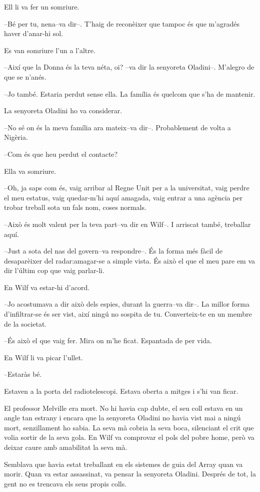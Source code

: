 Ell li va fer un somriure.

--Bé per tu, nena--va dir--. T'haig de reconèixer que tampoc és que
m'agradés haver d'anar-hi sol.

Es van somriure l'un a l'altre.

--Així que la Donna és la teva néta, oi? --va dir la senyoreta
Oladini--. M'alegro de que se n'anés.

--Jo també. Estaria perdut sense ella. La família és quelcom que s'ha de
mantenir.

La senyoreta Oladini ho va considerar.

--No sé on és la meva família ara mateix--va dir--. Probablement de
volta a Nigèria.

--Com és que heu perdut el contacte?

Ella va somriure.

--Oh, ja saps com és, vaig arribar al Regne Unit per a la universitat,
vaig perdre el meu estatus, vaig quedar-m'hi aquí amagada, vaig entrar a
una agència per trobar treball sota un fals nom, coses normals.

--Això és molt valent per la teva part--va dir en Wilf--. I arriscat
també, treballar aquí.

--Just a sota del nas del govern--va respondre--. És la forma més fàcil
de desaparèixer del radar:amagar-se a simple vista. És això el que el
meu pare em va dir l'últim cop que vaig parlar-li.

En Wilf va estar-hi d'acord.

--Jo acostumava a dir això dels espies, durant la guerra--va dir--. La
millor forma d'infiltrar-se és ser vist, així ningú no sospita de tu.
Converteix-te en un membre de la societat.

--És això el que vaig fer. Mira on m'he ficat. Espantada de per vida.

En Wilf li va picar l'ullet.

--Estaràs bé.

Estaven a la porta del radiotelescopi. Estava oberta a mitges i s'hi van
ficar.

El professor Melville era mort. No hi havia cap dubte, el seu coll
estava en un angle tan estrany i encara que la senyoreta Oladini no
havia vist mai a ningú mort, senzillament ho sabia. La seva mà cobria la
seva boca, silenciant el crit que volia sortir de la seva gola. En Wilf
va comprovar el pols del pobre home, però va deixar caure amb amabilitat
la seva mà.

Semblava que havia estat treballant en els sistemes de guia del Array
quan va morir. Quan va estar assassinat, va pensar la senyoreta Oladini.
Després de tot, la gent no es trencava els seus propis colls.

